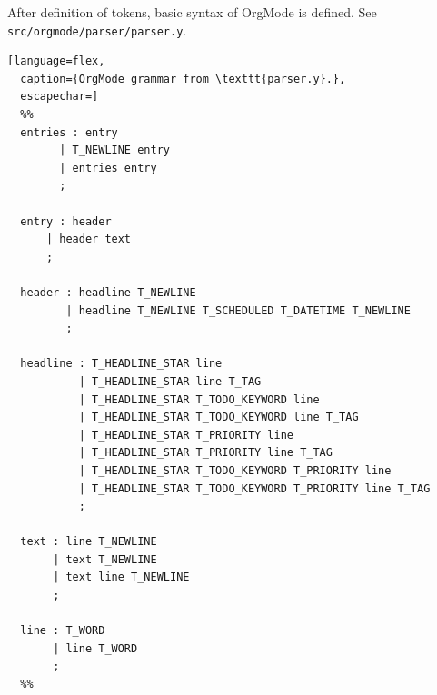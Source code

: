 \documentclass[a4paper,12pt,oneside]{scrartcl}
\begin{document}

After definition of tokens, basic syntax of OrgMode is defined. See
\texttt{src/orgmode/parser/parser.y}.

\begin{lstlisting}[language=flex,
  caption={OrgMode grammar from \texttt{parser.y}.},
  escapechar=]
  %%
  entries : entry
        | T_NEWLINE entry
        | entries entry
        ;

  entry : header
      | header text
      ;

  header : headline T_NEWLINE
         | headline T_NEWLINE T_SCHEDULED T_DATETIME T_NEWLINE
         ;

  headline : T_HEADLINE_STAR line
           | T_HEADLINE_STAR line T_TAG
           | T_HEADLINE_STAR T_TODO_KEYWORD line
           | T_HEADLINE_STAR T_TODO_KEYWORD line T_TAG
           | T_HEADLINE_STAR T_PRIORITY line
           | T_HEADLINE_STAR T_PRIORITY line T_TAG
           | T_HEADLINE_STAR T_TODO_KEYWORD T_PRIORITY line
           | T_HEADLINE_STAR T_TODO_KEYWORD T_PRIORITY line T_TAG
           ;

  text : line T_NEWLINE
       | text T_NEWLINE
       | text line T_NEWLINE
       ;

  line : T_WORD
       | line T_WORD
       ;
  %%
\end{lstlisting}
\end{document}
